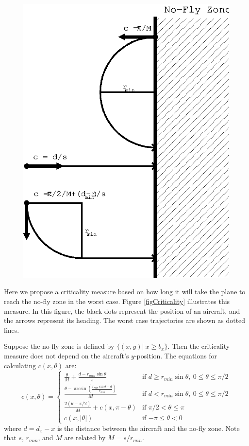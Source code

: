 \documentclass[11pt]{article}
\begin{document}
\begin{figure}[btp]
\centering
\includegraphics{criticality.eps}
\end{figure}

Here we propose a criticality measure based on how long it will take the plane
to reach the no-fly zone in the worst case. Figure \ref{figCriticality}
illustrates this measure.
In this figure, the black dots represent the position of an aircraft, and the
arrows represent its heading. The worst case trajectories are shown as dotted
lines.

Suppose the no-fly zone is defined by $\{(x,y)|\ x \geq b_{x}\}$. Then the
criticality measure does not depend on the aircraft's $y$-position. The
equations for calculating $c(x, \theta)$ are:
\[
c(x, \theta) = \left\{ \begin{array}{ll}
\frac{\theta}{M} + \frac{d - r_{min}\sin{\theta}}{s} & \mbox{if $d \geq r_{min}\sin{\theta},\ 0 \leq \theta \leq \pi/2$} \\
\frac{\theta - \arcsin{\left( \frac{r_{min}\sin{\theta}- d}{r_{min}}\right) }}{M} & \mbox{if $d < r_{min}\sin{\theta},\ 0 \leq \theta \leq \pi/2$} \\
\frac{2(\theta - \pi/2)}{M} + c(x, \pi - \theta) & \mbox{if $\pi/2 < \theta \leq \pi$} \\
c(x, |\theta|) & \mbox{if $-\pi \leq \theta < 0$}
\end{array}
\right.
\]
where $d = d_{x} - x$ is the distance between the aircraft and the no-fly zone.
Note that $s$, $r_{min}$, and $M$ are related by $M = s/r_{min}$.
\end{document}
